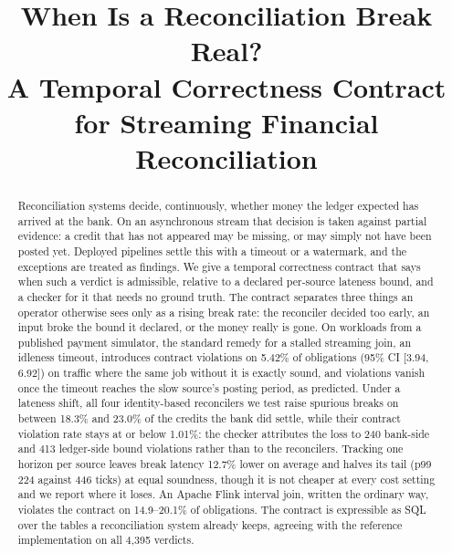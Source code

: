 \documentclass[10pt,conference]{IEEEtran}
\begin{document}
\title{When Is a Reconciliation Break Real?\\
A Temporal Correctness Contract for Streaming Financial Reconciliation}

\author{
}

\maketitle

\begin{abstract}
Reconciliation systems decide, continuously, whether money the ledger expected
has arrived at the bank. On an asynchronous stream that decision is taken
against partial evidence: a credit that has not appeared may be missing, or
may simply not have been posted yet. Deployed pipelines settle this with a
timeout or a watermark, and the exceptions are treated as findings. We give a
temporal correctness contract that says when such a verdict is admissible,
relative to a declared per-source lateness bound, and a checker for it that
needs no ground truth. The contract separates three things an operator
otherwise sees only as a rising break rate: the reconciler decided too early,
an input broke the bound it declared, or the money really is gone. On
workloads from a published payment simulator, the standard remedy for a
stalled streaming join, an idleness timeout, introduces contract violations on
5.42\% of obligations (95\% CI [3.94, 6.92]) on traffic where the same job
without it is exactly sound, and violations vanish once the timeout reaches
the slow source's posting period, as predicted. Under a lateness shift, all
four identity-based reconcilers we test raise spurious breaks on between
18.3\% and 23.0\% of the credits the bank did settle, while their contract
violation rate stays at or below 1.01\%: the checker attributes the loss to
240 bank-side and 413 ledger-side bound violations rather than to the
reconcilers. Tracking one horizon per source leaves break latency 12.7\% lower
on average and halves its tail (p99 224 against 446 ticks) at equal soundness,
though it is not cheaper at every cost setting and we report where it loses.
An Apache Flink interval join, written the ordinary way, violates the contract
on 14.9--20.1\% of obligations. The contract is expressible as SQL over the
tables a reconciliation system already keeps, agreeing with the reference
implementation on all 4{,}395 verdicts.
\end{abstract}
\end{document}
